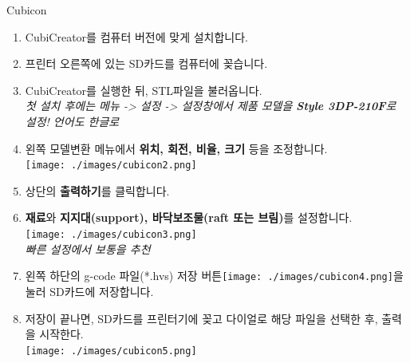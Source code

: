 \documentclass[a0paper,portrait]{baposter}
\begin{document}
\begin{poster}
\begin{posterbox}[name=Cubicon,column=1,below=printer,above=bottom]{Cubicon}
\begin{enumerate}
	\item \small CubiCreator를 컴퓨터 버전에 맞게 설치합니다.
	\item 프린터 오른쪽에 있는  SD카드를 컴퓨터에 꽂습니다.
	\item CubiCreator를 실행한 뒤, STL파일을 불러옵니다. \\
	\footnotesize \textit{첫 설치 후에는 메뉴 -> 설정 -> 설정창에서 제품 모델을 \textbf{Style 3DP-210F}로 설정! 언어도 한글로 }
	\item 왼쪽 모델변환 메뉴에서 \textbf{위치, 회전, 비율, 크기} 등을 조정합니다. \\
	\texttt{[image: ./images/cubicon2.png]}
	\item 상단의 \textbf{출력하기}를 클릭합니다.
	\item \textbf{재료}와 \textbf{지지대(support), 바닥보조물(raft 또는 브림)}를 설정합니다. \\
	\texttt{[image: ./images/cubicon3.png]} \\
	\footnotesize \textit{빠른 설정에서 보통을 추천} 
	\item \small 왼쪽 하단의 g-code 파일(*.hvs) 저장 버튼\texttt{[image: ./images/cubicon4.png]}을 눌러 SD카드에 저장합니다.
	\item 저장이 끝나면, SD카드를 프린터기에 꽂고 다이얼로 해당 파일을 선택한 후, 출력을 시작한다. \\
	\texttt{[image: ./images/cubicon5.png]} \\
\end{enumerate}
\end{posterbox}




\end{poster}
\end{document}
